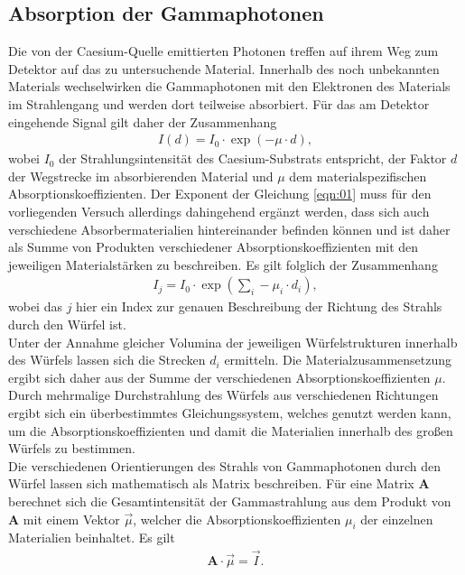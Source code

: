 \subsection{Absorption der Gammaphotonen}
Die von der Caesium-Quelle emittierten Photonen treffen auf ihrem Weg zum Detektor
auf das zu untersuchende Material. Innerhalb des noch unbekannten Materials
wechselwirken die Gammaphotonen mit den Elektronen des Materials im Strahlengang
und werden dort teilweise absorbiert. Für das am Detektor eingehende Signal gilt
daher der Zusammenhang
\begin{align}
  I(d) = I_0 \cdot \exp{(- \mu \cdot d)},
  \label{eqn:01}
\end{align}
wobei $I_0$ der Strahlungsintensität des Caesium-Substrats entspricht, der
Faktor $d$ der Wegstrecke im absorbierenden Material und $\mu$ dem
materialspezifischen Absorptionskoeffizienten. Der Exponent der Gleichung
\ref{eqn:01} muss für den vorliegenden Versuch allerdings dahingehend ergänzt
werden, dass sich auch verschiedene Absorbermaterialien hintereinander befinden
können und ist daher als Summe von Produkten verschiedener
Absorptionskoeffizienten mit den jeweiligen Materialstärken zu beschreiben. Es
gilt folglich der Zusammenhang
\begin{align}
  I_j = I_0 \cdot \exp{\left(\sum_{i} - \mu_i \cdot d_i \right)},
  \label{eqn:02}
\end{align}
\noindent wobei das $j$ hier ein Index zur genauen Beschreibung der Richtung des
Strahls durch den Würfel ist. \\
\noindent Unter der Annahme gleicher Volumina der jeweiligen Würfelstrukturen
innerhalb des Würfels lassen sich die Strecken $d_i$ ermitteln. Die
Materialzusammensetzung ergibt sich daher aus der Summe der
verschiedenen Absorptionskoeffizienten $\mu$. Durch mehrmalige Durchstrahlung
des Würfels aus verschiedenen Richtungen ergibt sich ein überbestimmtes
Gleichungssystem, welches genutzt werden kann, um die Absorptionskoeffizienten
und damit die Materialien innerhalb des großen Würfels zu bestimmen. \\
\noindent Die verschiedenen Orientierungen des Strahls von Gammaphotonen durch
den Würfel lassen sich mathematisch als Matrix beschreiben. Für eine Matrix $\textbf{A}$
berechnet sich die Gesamtintensität der Gammastrahlung aus dem Produkt von $\textbf{A}$
mit einem Vektor $\vec{\mu}$, welcher die Absorptionskoeffizienten $\mu_i$ der
einzelnen Materialien beinhaltet. Es gilt
\begin{align}
  \textbf{A} \cdot \vec{\mu} = \vec{I}.
  \label{eqn:03}
\end{align}
